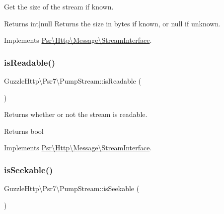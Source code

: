 Get the size of the stream if known.

\begin{DoxyReturn}{Returns}
int$\vert$null Returns the size in bytes if known, or null if unknown. 
\end{DoxyReturn}


Implements \hyperlink{interfacePsr_1_1Http_1_1Message_1_1StreamInterface_a85b9ff28e3ee39d95a47e623d866cf76}{Psr\textbackslash{}\+Http\textbackslash{}\+Message\textbackslash{}\+Stream\+Interface}.

\mbox{\label{classGuzzleHttp_1_1Psr7_1_1PumpStream_ad9122608c11bbd21d0b1476b5c8d5fa1}} 
\subsubsection{\texorpdfstring{is\+Readable()}{isReadable()}}
{\footnotesize\ttfamily Guzzle\+Http\textbackslash{}\+Psr7\textbackslash{}\+Pump\+Stream\+::is\+Readable (\begin{DoxyParamCaption}{ }\end{DoxyParamCaption})}

Returns whether or not the stream is readable.

\begin{DoxyReturn}{Returns}
bool 
\end{DoxyReturn}


Implements \hyperlink{interfacePsr_1_1Http_1_1Message_1_1StreamInterface_aecf78407aa241622ae200a9faa471d32}{Psr\textbackslash{}\+Http\textbackslash{}\+Message\textbackslash{}\+Stream\+Interface}.

\mbox{\label{classGuzzleHttp_1_1Psr7_1_1PumpStream_adb38791f41a513a01be857ad59eca8e7}} 
\subsubsection{\texorpdfstring{is\+Seekable()}{isSeekable()}}
{\footnotesize\ttfamily Guzzle\+Http\textbackslash{}\+Psr7\textbackslash{}\+Pump\+Stream\+::is\+Seekable (\begin{DoxyParamCaption}{ }\end{DoxyParamCaption})}

